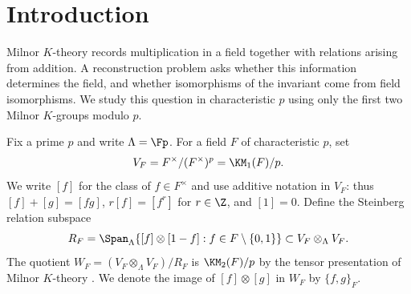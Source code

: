 \section{Introduction}\label{sec:introduction}

Milnor $K$-theory records multiplication in a field together with relations
arising from addition. A reconstruction problem asks whether this
information determines the field, and whether isomorphisms of the
invariant come from field isomorphisms. We study this question in
characteristic $p$ using only the first two Milnor $K$-groups modulo $p$.

Fix a prime $p$ and write $\Lambda=\Fp$. For a field $F$ of
characteristic $p$, set
\[
 V_F=F^\times/(F^\times)^p=\KM_1(F)/p.
\]
We write $[f]$ for the class of $f\in F^\times$ and use additive
notation in $V_F$: thus $[f]+[g]=[fg]$, $r[f]=[f^r]$ for
$r\in\Z$, and $[1]=0$. Define the Steinberg relation subspace
\[
 R_F=\Span_{\Lambda}
       \{[f]\otimes[1-f]:f\in F\setminus\{0,1\}\}
       \subset V_F\otimes_{\Lambda}V_F.
\]
The quotient $W_F=(V_F\otimes_{\Lambda}V_F)/R_F$ is
$\KM_2(F)/p$ by the tensor presentation of Milnor $K$-theory
\cite[Section~1]{Milnor1970}. We denote the image of
$[f]\otimes[g]$ in $W_F$ by $\{f,g\}_F$.

